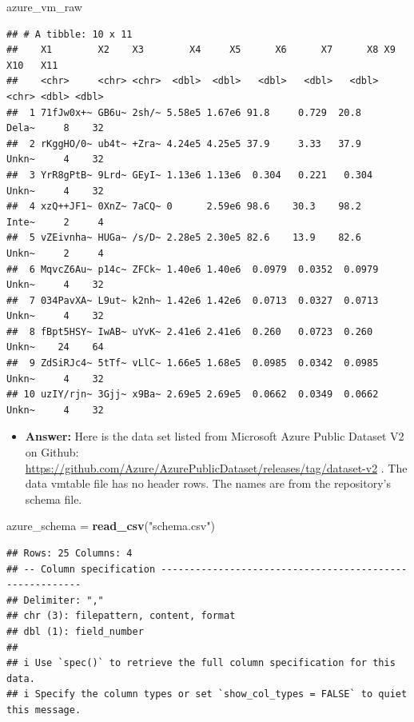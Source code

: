 \documentclass[
]{article}
\newenvironment{Shaded}{\begin{snugshade}}{\end{snugshade}}
\newcommand{\FunctionTok}[1]{\textcolor[rgb]{0.13,0.29,0.53}{\textbf{#1}}}
\newcommand{\NormalTok}[1]{#1}
\newcommand{\OtherTok}[1]{\textcolor[rgb]{0.56,0.35,0.01}{#1}}
\newcommand{\StringTok}[1]{\textcolor[rgb]{0.31,0.60,0.02}{#1}}
\providecommand{\tightlist}{%
  \setlength{\itemsep}{0pt}\setlength{\parskip}{0pt}}
\begin{document}
\begin{Shaded}
\begin{Highlighting}[]
\NormalTok{azure\_vm\_raw}
\end{Highlighting}
\end{Shaded}

\begin{verbatim}
## # A tibble: 10 x 11
##    X1        X2    X3        X4     X5      X6      X7      X8 X9      X10   X11
##    <chr>     <chr> <chr>  <dbl>  <dbl>   <dbl>   <dbl>   <dbl> <chr> <dbl> <dbl>
##  1 71fJw0x+~ GB6u~ 2sh/~ 5.58e5 1.67e6 91.8     0.729  20.8    Dela~     8    32
##  2 rKggHO/0~ ub4t~ +Zra~ 4.24e5 4.25e5 37.9     3.33   37.9    Unkn~     4    32
##  3 YrR8gPtB~ 9Lrd~ GEyI~ 1.13e6 1.13e6  0.304   0.221   0.304  Unkn~     4    32
##  4 xzQ++JF1~ 0XnZ~ 7aCQ~ 0      2.59e6 98.6    30.3    98.2    Inte~     2     4
##  5 vZEivnha~ HUGa~ /s/D~ 2.28e5 2.30e5 82.6    13.9    82.6    Unkn~     2     4
##  6 MqvcZ6Au~ p14c~ ZFCk~ 1.40e6 1.40e6  0.0979  0.0352  0.0979 Unkn~     4    32
##  7 034PavXA~ L9ut~ k2nh~ 1.42e6 1.42e6  0.0713  0.0327  0.0713 Unkn~     4    32
##  8 fBpt5HSY~ IwAB~ uYvK~ 2.41e6 2.41e6  0.260   0.0723  0.260  Unkn~    24    64
##  9 ZdSiRJc4~ 5tTf~ vLlC~ 1.66e5 1.68e5  0.0985  0.0342  0.0985 Unkn~     4    32
## 10 uzIY/rjn~ 3Gjj~ x9Ba~ 2.69e5 2.69e5  0.0662  0.0349  0.0662 Unkn~     4    32
\end{verbatim}

\begin{itemize}
\tightlist
\item
  \textbf{Answer:} Here is the data set listed from Microsoft Azure
  Public Dataset V2 on Github:
  \url{https://github.com/Azure/AzurePublicDataset/releases/tag/dataset-v2}
  . The data vmtable file has no header rows. The names are from the
  repository's schema file.
\end{itemize}

\begin{Shaded}
\begin{Highlighting}[]
\NormalTok{azure\_schema }\OtherTok{=} \FunctionTok{read\_csv}\NormalTok{(}\StringTok{"schema.csv"}\NormalTok{)}
\end{Highlighting}
\end{Shaded}

\begin{verbatim}
## Rows: 25 Columns: 4
## -- Column specification --------------------------------------------------------
## Delimiter: ","
## chr (3): filepattern, content, format
## dbl (1): field_number
## 
## i Use `spec()` to retrieve the full column specification for this data.
## i Specify the column types or set `show_col_types = FALSE` to quiet this message.
\end{verbatim}
\end{document}
